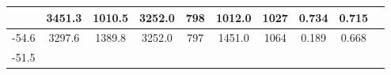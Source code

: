 \documentclass[a4paper,12pt]{article}
\begin{document}
\begin{longtable}{
     |
%    
    c|
%    
    c|
%    
    c|
%    
    c|
%    
    c|
%    
    c|
%    
    c|
%    
    c|
%    
    c|
%    
    c|
%    
    }
%        
        & 3451.3
%        

%        

%        
        & 1010.5
%        

%        

%        
        & 3252.0
%        

%        

%        
        & 798
%        

%        

%        
        & 1012.0
%        

%        

%        
        & 1027
%        

%        

%        
        & 0.734
%        

%        

%        
        & 0.715
%        

%        
        \\
        \hline

        

%        

%        
        -54.6
%        

%        

%        
        & 3297.6
%        

%        

%        
        & 1389.8
%        

%        

%        
        & 3252.0
%        

%        

%        
        & 797
%        

%        

%        
        & 1451.0
%        

%        

%        
        & 1064
%        

%        

%        
        & 0.189
%        

%        

%        
        & 0.668
%        

%        
        \\
        \hline

        

%        

%        
        -51.5
%        

%        


\end{longtable}
\end{document}
